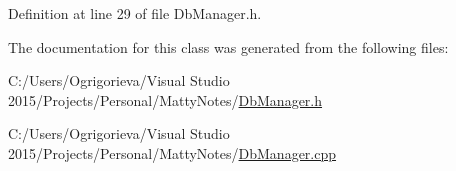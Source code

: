 Definition at line 29 of file Db\+Manager.\+h.



The documentation for this class was generated from the following files\+:\begin{DoxyCompactItemize}
\item 
C\+:/\+Users/\+Ogrigorieva/\+Visual Studio 2015/\+Projects/\+Personal/\+Matty\+Notes/\hyperlink{DbManager_8h}{Db\+Manager.\+h}\item 
C\+:/\+Users/\+Ogrigorieva/\+Visual Studio 2015/\+Projects/\+Personal/\+Matty\+Notes/\hyperlink{DbManager_8cpp}{Db\+Manager.\+cpp}\end{DoxyCompactItemize}
